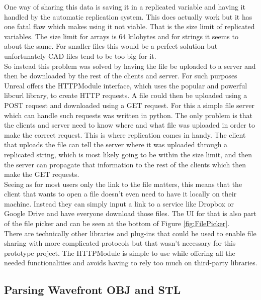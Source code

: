 One way of sharing this data is saving it in a replicated variable and having it handled by the automatic replication system. This does actually work but it has one fatal flaw which makes using it not viable. That is the size limit of replicated variables. The size limit for arrays is 64 kilobytes and for strings it seems to about the same. For smaller files this would be a perfect solution but unfortunately CAD files tend to be too big for it.\\
So instead this problem was solved by having the file be uploaded to a server and then be downloaded by the rest of the clients and server. For such purposes Unreal offers the HTTPModule interface, which uses the popular and powerful libcurl library, to create HTTP requests. A file could then be uploaded using a POST request and downloaded using a GET request. For this a simple file server which can handle such requests was written in python. The only problem is that the clients and server need to know where and what file was uploaded in order to make the correct request. This is where replication comes in handy. The client that uploads the file can tell the server where it was uploaded through a replicated string, which is most likely going to be within the size limit, and then the server can propagate that information to the rest of the clients which then make the GET requests.\\
Seeing as for most users only the link to the file matters, this means that the client that wants to open a file doesn't even need to have it locally on their machine. Instead they can simply input a link to a service like Dropbox or Google Drive and have everyone download those files. The UI for that is also part of the file picker and can be seen at the bottom of Figure \ref{fig:FilePicker}.\\
There are technically other libraries and plug-ins that could be used to enable file sharing with more complicated protocols but that wasn't necessary for this prototype project. The HTTPModule is simple to use while offering all the needed functionalities and avoids having to rely too much on third-party libraries.


\subsection{Parsing Wavefront OBJ and STL}

